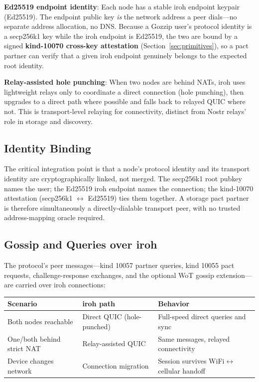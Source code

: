 \documentclass[11pt,a4paper]{article}
\begin{document}
\textbf{Ed25519 endpoint identity}: Each node has a stable iroh endpoint keypair (Ed25519). The endpoint public key \emph{is} the network address a peer dials---no separate address allocation, no DNS. Because a Gozzip user's protocol identity is a secp256k1 key while the iroh endpoint is Ed25519, the two are bound by a signed \textbf{kind-10070 cross-key attestation} (Section~\ref{sec:primitives}), so a pact partner can verify that a given iroh endpoint genuinely belongs to the expected root identity.

\textbf{Relay-assisted hole punching}: When two nodes are behind NATs, iroh uses lightweight relays only to coordinate a direct connection (hole punching), then upgrades to a direct path where possible and falls back to relayed QUIC where not. This is transport-level relaying for connectivity, distinct from Nostr relays' role in storage and discovery.

\subsection{Identity Binding}

The critical integration point is that a node's protocol identity and its transport identity are cryptographically linked, not merged. The secp256k1 root pubkey names the user; the Ed25519 iroh endpoint names the connection; the kind-10070 attestation (secp256k1 $\leftrightarrow$ Ed25519) ties them together. A storage pact partner is therefore simultaneously a directly-dialable transport peer, with no trusted address-mapping oracle required.

\subsection{Gossip and Queries over iroh}

The protocol's peer messages---kind 10057 partner queries, kind 10055 pact requests, challenge-response exchanges, and the optional WoT gossip extension---are carried over iroh connections:

\begin{table}[h]
\centering
\small
\begin{tabular}{lll}
\toprule
\textbf{Scenario} & \textbf{iroh path} & \textbf{Behavior} \\
\midrule
Both nodes reachable & Direct QUIC (hole-punched) & Full-speed direct queries and sync \\
One/both behind strict NAT & Relay-assisted QUIC & Same messages, relayed connectivity \\
Device changes network & Connection migration & Session survives WiFi$\leftrightarrow$cellular handoff \\
\bottomrule
\end{tabular}
\end{table}
\end{document}
